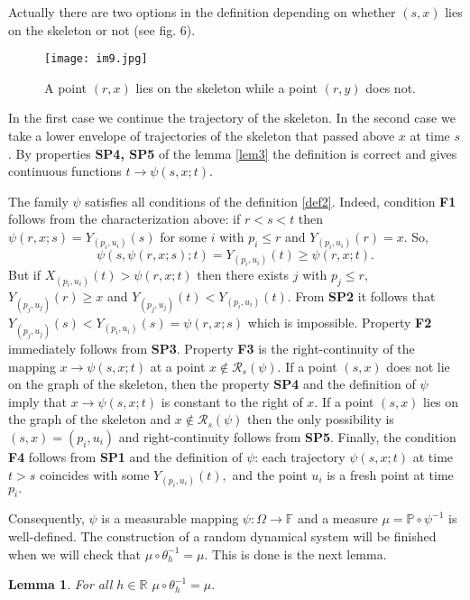 \documentclass[a4paper,12pt]{article}
\newcommand{\1}{1\!\!\,{\rm I}}
\theoremstyle{plain}
\newtheorem{lemma}{Lemma}[section]
\begin{document}
Actually there are two options in the definition depending on whether $(s,x)$ lies on the skeleton or not (see fig. 6).

\begin{figure}[!h]
	\centering
	\caption{A point $(r,x)$ lies on the skeleton while a point $(r,y)$ does not.}
	\texttt{[image: im9.jpg]}
\end{figure}

In the first case we continue the trajectory of the skeleton. In the second case we take a lower envelope of trajectories of the skeleton that passed above $x$ at time $s$. By properties {\bf SP4, SP5} of the lemma \ref{lem3} the definition is correct and gives continuous functions $t\to \psi(s,x;t)$. 


The family $\psi$ satisfies all conditions of the definition \ref{def2}. Indeed, condition {\bf F1} follows from the characterization above: if $r<s<t$ then $\psi(r,x;s)=Y_{(p_i,u_i)}(s)$ 
for some $i$ with $p_i\leq r$ and $Y_{(p_i,u_i)}(r)=x.$ So,
$$
\psi(s,\psi(r,x;s);t)=Y_{(p_i,u_i)}(t)\geq \psi(r,x;t).
$$
But if $X_{(p_i,u_i)}(t)> \psi(r,x;t)$ then there exists $j$ with $p_j\leq r,$ $Y_{(p_j,u_j)}(r)\geq x$ and $Y_{(p_j,u_j)}(t)<Y_{(p_i,u_i)}(t).$ From {\bf SP2} it follows that $Y_{(p_j,u_j)}(s)<Y_{(p_i,u_i)}(s)=\psi(r,x;s)$ which is impossible. Property {\bf F2} immediately follows from {\bf SP3}.  Property {\bf F3} is the right-continuity of the mapping $x\to \psi(s,x;t)$ at a point $x\not\in \mathcal{R}_s(\psi).$ If a point $(s,x)$ does not lie on the graph of the skeleton, then the property {\bf SP4} and the definition of $\psi$ imply that $x\to \psi(s,x;t)$ is constant to the right of $x$. If a point $(s,x)$ lies on the graph of the skeleton and $x\not\in\mathcal{R}_s(\psi)$ then the only possibility is $(s,x)=(p_i,u_i)$ and right-continuity follows from {\bf SP5}. Finally, the condition {\bf F4} follows from {\bf SP1} and the definition of $\psi$: each trajectory $\psi(s,x;t)$ at time $t>s$ coincides with some $Y_{(p_i,u_i)}(t),$ and the point $u_i$ is a fresh point at time $p_i.$

Consequently, $\psi$ is a measurable mapping $\psi:\Omega\to \mathbb{F}$ and a measure $\mu=\mathbb{P}\circ \psi^{-1}$ is well-defined. The construction of a random dynamical system will be finished when we will check that $\mu\circ \theta^{-1}_h=\mu.$ This is done is the next lemma.

\begin{lemma}\label{lem4} For all $h\in \mathbb{R}$ $\mu\circ \theta^{-1}_h=\mu.$
	
	
\end{lemma}
\end{document}
